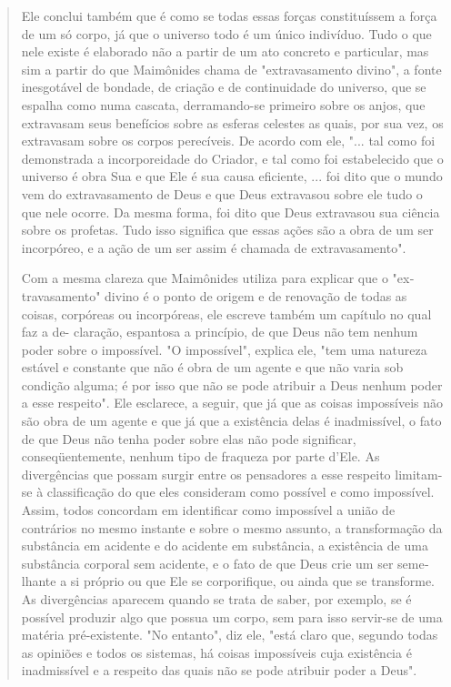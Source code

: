 \begin{quote}
Ele conclui também que é como se todas essas forças constituíssem a
força de um só corpo, já que o universo todo é um único indivíduo. Tudo
o que nele existe é elaborado não a partir de um ato concreto e
particular, mas sim a partir do que Maimônides chama de "extravasamento
divino", a fonte inesgotável de bondade, de criação e de continuidade do
universo, que se es­palha como numa cascata, derramando-se primeiro
sobre os anjos, que extra­vasam seus benefícios sobre as esferas
celestes as quais, por sua vez, os extrava­sam sobre os corpos
perecíveis. De acordo com ele, "... tal como foi demons­trada a
incorporeidade do Criador, e tal como foi estabelecido que o universo é
obra Sua e que Ele é sua causa eficiente, ... foi dito que o mundo vem
do extravasamento de Deus e que Deus extravasou sobre ele tudo o que
nele ocorre. Da mesma forma, foi dito que Deus extravasou sua ciência
sobre os profetas. Tudo isso significa que essas ações são a obra de um
ser incorpóreo, e a ação de um ser assim é chamada de extravasamento".

Com a mesma clareza que Maimônides utiliza para explicar que o
"ex­travasamento" divino é o ponto de origem e de renovação de todas as
coisas, corpóreas ou incorpóreas, ele escreve também um capítulo no qual
faz a de-
claração, espantosa a princípio, de que Deus não tem nenhum poder sobre
o impossível. "O impossível", explica ele, "tem uma natureza estável e
constan­te que não é obra de um agente e que não varia sob condição
alguma; é por isso que não se pode atribuir a Deus nenhum poder a esse
respeito". Ele escla­rece, a seguir, que já que as coisas impossíveis
não são obra de um agente e que já que a existência delas é
inadmissível, o fato de que Deus não tenha po­der sobre elas não pode
significar, conseqüentemente, nenhum tipo de fraque­za por parte d'Ele.
As divergências que possam surgir entre os pensadores a es­se respeito
limitam-se à classificação do que eles consideram como possível e como
impossível. Assim, todos concordam em identificar como impossível a
união de contrários no mesmo instante e sobre o mesmo assunto, a
transfor­mação da substância em acidente e do acidente em substância, a
existência de uma substância corporal sem acidente, e o fato de que Deus
crie um ser seme­lhante a si próprio ou que Ele se corporifique, ou
ainda que se transforme. As divergências aparecem quando se trata de
saber, por exemplo, se é possível pro­duzir algo que possua um corpo,
sem para isso servir-se de uma matéria pré-exis­tente. "No entanto", diz
ele, "está claro que, segundo todas as opiniões e to­dos os sistemas, há
coisas impossíveis cuja existência é inadmissível e a respei­to das
quais não se pode atribuir poder a Deus".


\end{quote}
